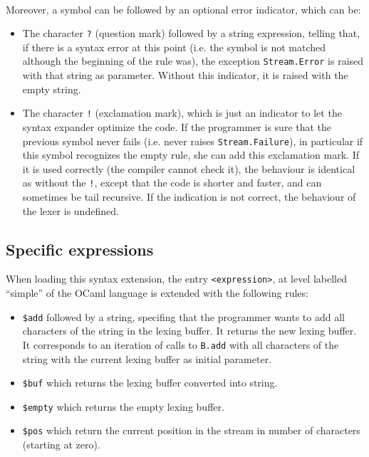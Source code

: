\documentclass[11pt]{article}
\begin{document}
\

Moreover, a symbol can be followed by an optional error indicator,
which can be:

\begin{itemize}

\item The character \verb/?/ (question mark) followed by a string
  expression, telling that, if there is a syntax error at this point
  (i.e. the symbol is not matched although the beginning of the rule
  was), the exception \verb/Stream.Error/ is raised with that string
  as parameter. Without this indicator, it is raised with the empty
  string.

\item The character \verb/!/ (exclamation mark), which is just an
  indicator to let the syntax expander optimize the code. If the
  programmer is sure that the previous symbol never fails (i.e. never
  raises \verb/Stream.Failure/), in particular if this symbol
  recognizes the empty rule, she can add this exclamation mark. If it
  is used correctly (the compiler cannot check it), the behaviour is
  identical as without the \verb/!/, except that the code is shorter
  and faster, and can sometimes be tail recursive. If the indication
  is not correct, the behaviour of the lexer is undefined.

\end{itemize}

\subsection{Specific expressions}
\label{specific}

When loading this syntax extension, the entry \verb/<expression>/, at
level labelled ``simple'' of the OCaml language is extended with the
following rules:

\begin{itemize}

\item \verb/$add/ followed by a string, specifing that the programmer
  wants to add all characters of the string in the lexing buffer. It
  returns the new lexing buffer. It corresponds to an iteration of
  calls to \verb/B.add/ with all characters of the string with the
  current lexing buffer as initial parameter.

\item \verb/$buf/ which returns the lexing buffer converted into
  string.

\item \verb/$empty/ which returns the empty lexing buffer.

\item \verb/$pos/ which return the current position in the stream in
  number of characters (starting at zero).

\end{itemize}
\end{document}
